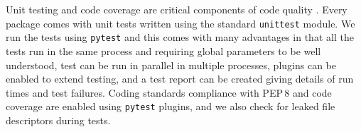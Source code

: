Unit testing and code coverage are critical components of code quality \citep{2018SPIE10707-10J}.
Every package comes with unit tests written using the standard \texttt{unittest} module.
We run the tests using \texttt{pytest} \citep{pytest} and this comes with many advantages in that all the tests run in the same process and requiring global parameters to be well understood, test can be run in parallel in multiple processes, plugins can be enabled to extend testing, and a test report can be created giving details of run times and test failures.
Coding standards compliance with PEP\,8 \citep{pep8} and code coverage are enabled using \texttt{pytest} plugins, and we also check for leaked file descriptors during tests.
